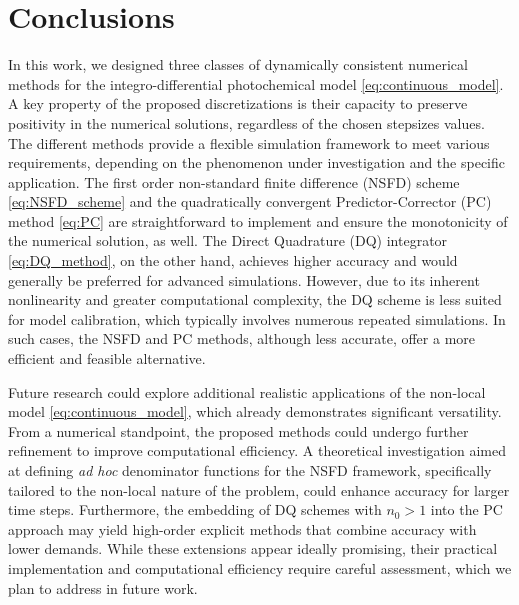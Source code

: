 \documentclass[a4paper, UKenglish, numberwithinsect, thm-restate]{tgdk-v2021}
\begin{document}
\section{Conclusions}\label{sec:Conclusions}
In this work, we designed three classes of dynamically consistent numerical methods for the integro-differential photochemical model \eqref{eq:continuous_model}. A key property of the proposed discretizations is their capacity to preserve positivity in the numerical solutions, regardless of the chosen stepsizes values. The different methods provide a flexible simulation framework to meet various requirements, depending on the phenomenon under investigation and the specific application. The first order non-standard finite difference (NSFD) scheme \eqref{eq:NSFD_scheme} and the quadratically convergent Predictor-Corrector (PC) method \eqref{eq:PC} are straightforward to implement and ensure the monotonicity of the numerical solution, as well. The Direct Quadrature (DQ) integrator \eqref{eq:DQ_method}, on the other hand, achieves higher accuracy and would generally be preferred for advanced simulations. However, due to its inherent nonlinearity and greater computational complexity, the DQ scheme is less suited for model calibration, which typically involves numerous repeated simulations. In such cases, the NSFD and PC methods, although less accurate, offer a more efficient and feasible alternative.

Future research could explore additional realistic applications of the non-local model \eqref{eq:continuous_model}, which already demonstrates significant versatility. From a numerical standpoint, the proposed methods could undergo further refinement to improve computational efficiency. A theoretical investigation aimed at defining \textit{ad hoc} denominator functions for the NSFD framework, specifically tailored to the non-local nature of the problem, could enhance accuracy for larger time steps. Furthermore, the embedding of DQ schemes with $n_0>1$ into the PC approach may yield high-order explicit methods that combine accuracy with lower demands. While these extensions appear ideally promising, their practical implementation and computational efficiency require careful assessment, which we plan to address in future work.

\end{document}
